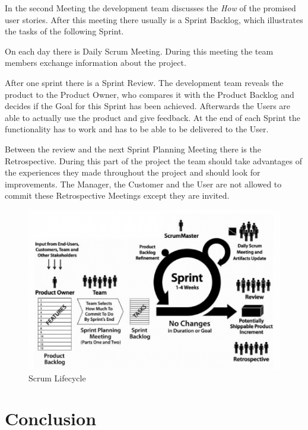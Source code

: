 In the second Meeting the development team discusses the \emph{How} of the
promised user stories. After this meeting there usually is a Sprint Backlog,
which illustrates the tasks of the following Sprint.

On each day there is Daily Scrum Meeting. During this meeting the team members
exchange information about the project.

After one sprint there is a Sprint Review. The development team reveals the
product to the Product Owner, who compares it with the Product Backlog and
decides if the Goal for this Sprint has been achieved. Afterwards the Users
are able to actually use the product and give feedback.  At the end of each
Sprint the functionality has to work and has to be able to be delivered to the
User.

Between the review and the next Sprint Planning Meeting there is the
Retrospective. During this part of the project the team should take advantages
of the experiences they made throughout the project and should look for
improvements. The Manager, the Customer and the User are not allowed to commit
these Retrospective Meetings except they are invited.~\cite{five,seven,eight}

\begin{figure}[h!]
   \includegraphics[width=1.0\columnwidth]{scrum-methodology}
   \caption{Scrum Lifecycle\protect\footnotemark}
\end{figure}


\section{Conclusion} %
\label{sec:conclusion}

